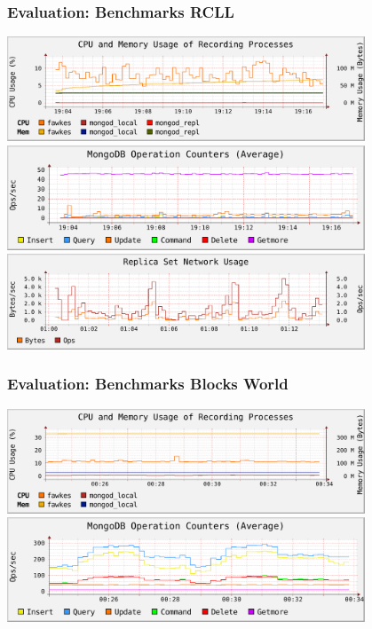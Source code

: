 \begin{frame}
  \frametitle{Evaluation: Benchmarks RCLL}
  \centering
  \includegraphics[width=0.8\textwidth]{../thesis/plots/rcll-local/cpu-mem}\\
  \vspace{0.1cm}
  \includegraphics[width=0.8\textwidth]{../thesis/plots/rcll-local/operations}\\
  \vspace{0.1cm}
  \includegraphics[width=0.8\textwidth]{../thesis/plots/rsnetwork}
\end{frame}

\begin{frame}
  \frametitle{Evaluation: Benchmarks Blocks World}
  \centering
  \includegraphics[width=0.8\textwidth]{../thesis/plots/blocksworld/cpu-mem}\\
  \vspace{0.1cm}
  \includegraphics[width=0.8\textwidth]{../thesis/plots/blocksworld/operations}
\end{frame}

